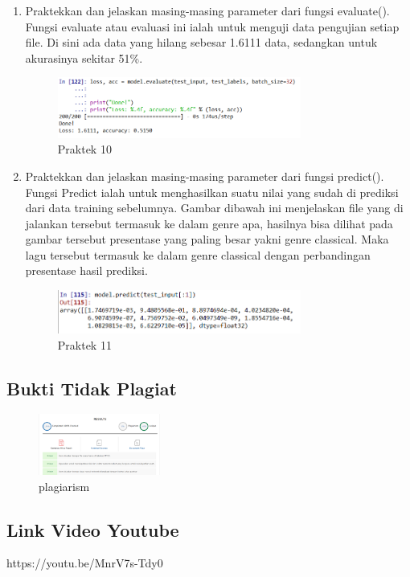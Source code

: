 \begin{enumerate}
\item Praktekkan dan jelaskan masing-masing parameter dari fungsi evaluate().
	\hfill\\
	Fungsi evaluate atau evaluasi ini ialah untuk menguji data pengujian setiap file. Di sini ada data yang hilang sebesar 1.6111 data, sedangkan untuk akurasinya sekitar 51\%.
	
\begin{figure}[H]
    \includegraphics[width=8cm]{figures/1174084/6/13.png}
    \centering
    \caption{Praktek 10}
\end{figure}


\item Praktekkan dan jelaskan masing-masing parameter dari fungsi predict().
	\hfill\\
	Fungsi Predict ialah untuk menghasilkan suatu nilai yang sudah di prediksi dari data training sebelumnya. Gambar dibawah ini menjelaskan file yang di jalankan tersebut termasuk ke dalam genre apa, hasilnya bisa dilihat pada gambar tersebut presentase yang paling besar yakni genre classical. Maka lagu tersebut termasuk ke dalam genre classical dengan perbandingan presentase hasil prediksi.
	
\begin{figure}[H]
    \includegraphics[width=8cm]{figures/1174084/6/14.png}
    \centering
    \caption{Praktek 11}
\end{figure}

\end{enumerate}


\subsection{Bukti Tidak Plagiat}
\begin{figure}[H]
	\includegraphics[width=4cm]{figures/1174084/6/plagiarism.png}
	\centering
	\caption{plagiarism}
\end{figure}


\subsection{Link Video Youtube}
https://youtu.be/MnrV7s-Tdy0

